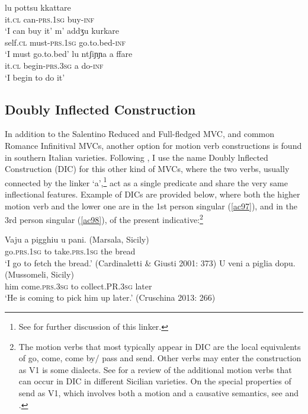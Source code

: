 \documentclass[output=paper]{langscibook}
\begin{document}
\ea \label{ac96}
    \ea \gll lu      pottsu     kkattare\\
    it.\textsc{cl} can-\textsc{prs}.\textsc{1sg} buy-\textsc{inf}\\
    \glt `I can buy it'
    \ex \gll m’    addʒu      kurkare\\
    self.\textsc{cl}  must-\textsc{prs}.\textsc{1sg}   go.to.bed-\textsc{inf} \\
    \glt `I must go.to.bed'
    \ex \gll lu ntʃiɲɲa       a  ffare\\
    it.\textsc{cl} begin-\textsc{prs}.\textsc{3sg} a  do-\textsc{inf} \\
    \glt `I begin to do it'
    \z
\z

\subsection{Doubly Inflected Construction}

In addition to the Salentino Reduced and Full-fledged MVC, and common Romance Infinitival MVCs, another option for motion verb constructions is found in southern Italian varieties. Following \cite{cruschina2013a}, I use the name Doubly lnflected Construction (DIC) for this other kind of MVCs, where the two verbs, usually connected by the linker ‘a’,\footnote{See \cite{calabrese2021a} for further discussion of this linker.}  act as a single predicate and share the very same inflectional features. Example of DICs are provided below, where both the higher motion verb and the lower one are in the 1st person singular (\ref{ac97}), and in the 3rd person singular (\ref{ac98}), of the present indicative:\footnote{The motion verbs that most typically appear in DIC are the local equivalents of go, come, come by/ pass and send. Other verbs may enter the construction as V1 is some dialects. See \cite{caro2018a, caro2019a} for a review of the additional motion verbs that can occur in DIC in different Sicilian varieties. On the special properties of send as V1, which involves both a motion and a causative semantics, see \cite{todaro2018a} and \cite{prete2020a}.}

\ea \label{ac97}
\gll Vaju    a   pigghiu    u   pani.    (Marsala, Sicily)\\
   go.\textsc{prs}.\textsc{1sg} to   take.\textsc{prs}.\textsc{1sg}  the  bread \\
 \glt  ‘I go to fetch the bread.’ \hfill (Cardinaletti \& Giusti 2001: 373)
\ex \label{ac98}
\gll  U   veni      a  piglia   dopu.      (Mussomeli, Sicily)\\
   him  come.\textsc{prs}.\textsc{3sg}  to  collect.PR.\textsc{3sg} later\\
\glt   ‘He is coming to pick him up later.’ \hfill  (Cruschina 2013: 266)
\z
\end{document}

